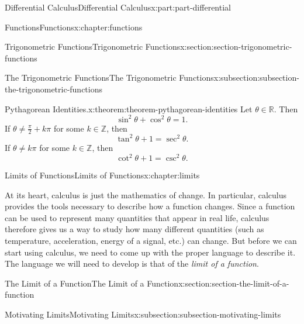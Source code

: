 \documentclass[twoside,10pt,]{tufte-book}
\numberwithin{equation}{part}
\newcommand{\RR}{\mathbb{R}}
\newcommand{\ZZ}{\mathbb{Z}}
\begin{document}
\begin{partptx}{Differential Calculus}{}{Differential Calculus}{}{}{x:part:part-differential}
\begin{chapterptx}{Functions}{}{Functions}{}{}{x:chapter:functions}
\begin{sectionptx}{Trigonometric Functions}{}{Trigonometric Functions}{}{}{x:section:section-trigonometric-functions}
\begin{subsectionptx}{The Trigonometric Functions}{}{The Trigonometric Functions}{}{}{x:subsection:subsection-the-trigonometric-functions}
\begin{theorem}{Pythagorean Identities.}{}{x:theorem:theorem-pythagorean-identities}
Let \(\theta\in\RR\). Then%
\begin{equation*}
\sin^2\theta + \cos^2\theta = 1\text{.}
\end{equation*}
If \(\theta\neq\frac{\pi}{2}+k\pi\) for some \(k\in\ZZ\), then%
\begin{equation*}
\tan^2\theta + 1 = \sec^2\theta\text{.}
\end{equation*}
If \(\theta\neq k\pi\) for some \(k\in\ZZ\), then%
\begin{equation*}
\cot^2\theta + 1 = \csc^2\theta\text{.}
\end{equation*}
%
\end{theorem}
\end{subsectionptx}
\end{sectionptx}
\end{chapterptx}
%
\typeout{************************************************}
\typeout{************************************************}
%
\begin{chapterptx}{Limits of Functions}{}{Limits of Functions}{}{}{x:chapter:limits}
\begin{introduction}{}%
At its heart, calculus is just the mathematics of change. In particular, calculus provides the tools necessary to describe how a function changes. Since a function can be used to represent many quantities that appear in real life, calculus therefore gives us a way to study how many different quantities (such as temperature, acceleration, energy of a signal, etc.) can change. But before we can start using calculus, we need to come up with the proper language to describe it. The language we will need to develop is that of the \emph{limit of a function}.%
\end{introduction}%
%
%
\typeout{************************************************}
\typeout{************************************************}
%
\begin{sectionptx}{The Limit of a Function}{}{The Limit of a Function}{}{}{x:section:section-the-limit-of-a-function}
%
%
\typeout{************************************************}
\typeout{************************************************}
%
\begin{subsectionptx}{Motivating Limits}{}{Motivating Limits}{}{}{x:subsection:subsection-motivating-limits}

\end{subsectionptx}
\end{sectionptx}
\end{chapterptx}
\end{partptx}
\end{document}
